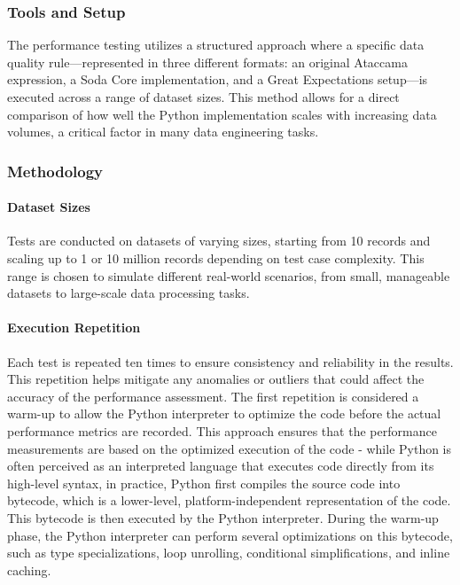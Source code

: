 \subsubsection{Tools and Setup}

The performance testing utilizes a structured approach where a specific data quality rule—represented in three different formats: an original Ataccama expression, a Soda Core implementation, and a Great Expectations setup—is executed across a range of dataset sizes. This method allows for a direct comparison of how well the Python implementation scales with increasing data volumes, a critical factor in many data engineering tasks.

\subsubsection{Methodology}

\paragraph{Dataset Sizes} Tests are conducted on datasets of varying sizes, starting from 10 records and scaling up to 1 or 10 million records depending on test case complexity. This range is chosen to simulate different real-world scenarios, from small, manageable datasets to large-scale data processing tasks.

\paragraph{Execution Repetition} Each test is repeated ten times to ensure consistency and reliability in the results. This repetition helps mitigate any anomalies or outliers that could affect the accuracy of the performance assessment.
The first repetition is considered a warm-up to allow the Python interpreter to optimize the code before the actual performance metrics are recorded. This approach ensures that the performance measurements are based on the optimized execution of the code - while Python is often perceived as an interpreted language that executes code directly from its high-level syntax, in practice, Python first compiles the source code into bytecode, which is a lower-level, platform-independent representation of the code. This bytecode is then executed by the Python interpreter. During the warm-up phase, the Python interpreter can perform several optimizations on this bytecode, such as type specializations, loop unrolling, conditional simplifications, and inline caching. 

